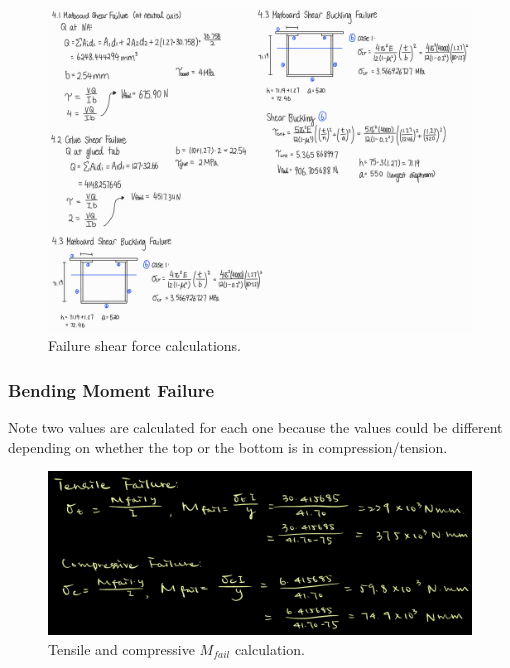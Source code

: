 \documentclass{article}
\begin{document}
\begin{figure}[H]
    \centering
    \includegraphics[width=\textwidth]{shear.png}
    \caption{Failure shear force calculations.}
\end{figure}

\subsubsection{Bending Moment Failure}

Note two values are calculated for each one because the values could be different depending on whether the top or the
bottom is in compression/tension.

\begin{figure}[H]
    \centering
    \includegraphics[width=\textwidth]{tensile_compressive_failure.png}
    \caption{Tensile and compressive \(M_{fail}\) calculation.}
\end{figure}
\end{document}
